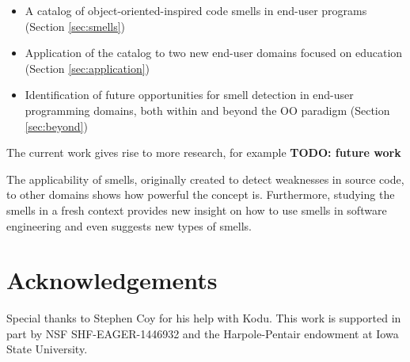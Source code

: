\documentclass{sig-alternate}
\newcommand{\todo}[1]{\textbf{TODO: #1}}
\begin{document}
\begin{itemize}
	\item A catalog of object-oriented-inspired code smells in end-user programs (Section \ref{sec:smells})
	\item Application of the catalog to two new end-user domains focused on education (Section \ref{sec:application})
	\item Identification of future opportunities for smell detection in end-user programming domains, both within and beyond the OO paradigm (Section \ref{sec:beyond})
\end{itemize}

The current work gives rise to more research, for example \todo{future work}

The applicability of smells, originally created to detect weaknesses in source code, to other domains shows how powerful the concept is. Furthermore, studying the smells in a fresh context provides new insight on how to use smells in software engineering and even suggests new types of smells. 

\balance

\section*{Acknowledgements}
Special thanks to Stephen Coy for his help with Kodu. This work is supported in part by  NSF SHF-EAGER-1446932 and the Harpole-Pentair endowment at Iowa State University.




\end{document}
